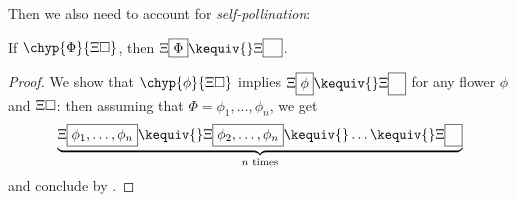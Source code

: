 \begin{scope}
Then we also need to account for \emph{self-pollination}:

\begin{lemma}[Pollination]
  
  If $\chyp{\Phi}{\Xi\hole}$, then $\Xi\select{\Phi} \kequiv{}
  \Xi\select{\phantom{\Phi}}$.
\end{lemma}
\begin{proof}
  We show that $\chyp{\phi}{\Xi\hole}$ implies $\Xi\select{\phi} \kequiv{}
  \Xi\select{\phantom{\phi}}$ for any flower $\phi$ and  $\Xi\square$: then
  assuming that $\Phi = \phi_1, \ldots, \phi_n$, we get
  $$\underbrace{\Xi\select{\phi_1, \ldots, \phi_n} \kequiv{} \Xi\select{\phi_2,
  \ldots, \phi_n} \kequiv{} \ldots \kequiv{} \Xi\select{\phantom{\phi}}}_{\text{$n$
  times}}$$ and conclude by .
  

\end{proof}
\end{scope}
